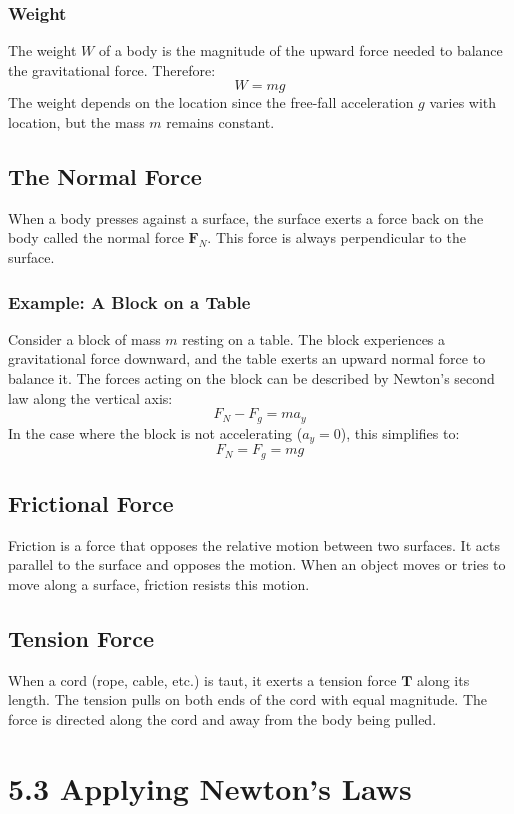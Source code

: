 \documentclass{article}
\begin{document}
\subsubsection*{Weight}
The weight $W$ of a body is the magnitude of the upward force needed to balance the gravitational force. Therefore:
\[
W = mg
\]
The weight depends on the location since the free-fall acceleration $g$ varies with location, but the mass $m$ remains constant.

\subsection*{The Normal Force}
When a body presses against a surface, the surface exerts a force back on the body called the normal force $\mathbf{F}_N$. This force is always perpendicular to the surface.

\subsubsection*{Example: A Block on a Table}
Consider a block of mass $m$ resting on a table. The block experiences a gravitational force downward, and the table exerts an upward normal force to balance it. The forces acting on the block can be described by Newton's second law along the vertical axis:
\[
F_N - F_g = ma_y
\]
In the case where the block is not accelerating ($a_y = 0$), this simplifies to:
\[
F_N = F_g = mg
\]

\subsection*{Frictional Force}
Friction is a force that opposes the relative motion between two surfaces. It acts parallel to the surface and opposes the motion. When an object moves or tries to move along a surface, friction resists this motion.

\subsection*{Tension Force}
When a cord (rope, cable, etc.) is taut, it exerts a tension force $\mathbf{T}$ along its length. The tension pulls on both ends of the cord with equal magnitude. The force is directed along the cord and away from the body being pulled.

\section*{5.3 Applying Newton's Laws}
\end{document}
